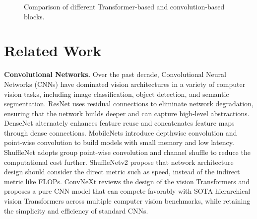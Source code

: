 \documentclass[10pt,twocolumn,letterpaper]{article}
\begin{document}
\begin{figure*} [t]
\centering
{}
\hspace{0.01mm}
\hspace{0.01mm}
\hspace{0.01mm}
\hspace{0.01mm}
\hspace{0.01mm}
\hspace{0.01mm}
\caption{Comparison of different Transformer-based and convolution-based blocks.}
\label{fig:blocks}
\end{figure*}

\section{Related Work}
	\textbf{Convolutional Networks.}
    Over the past decade, Convolutional Neural Networks (CNNs) have dominated vision architectures in a variety of computer vision tasks, including image classification, object detection, and semantic segmentation.
    ResNet\cite{ResNet} uses residual connections to eliminate network degradation, ensuring that the network builds deeper and can capture high-level abstractions.
	DenseNet\cite{DenseNet} alternately enhances feature reuse and concatenates feature maps through dense connections.
	MobileNets\cite{Mobilenets, MobileNet_v2}  introduce depthwise convolution and point-wise convolution to build models with small memory and low latency.
	ShuffleNet\cite{Shufflenet} adopts group point-wise convolution and channel shuffle to reduce the computational cost further. ShuffleNetv2\cite{ShuffleNet_v2} propose that network architecture design should consider the direct metric such as speed, instead of the indirect metric like FLOPs. 
	ConvNeXt\cite{ConvNext} reviews the design of the vision Transformers and proposes a pure CNN model that can compete favorably with SOTA hierarchical vision Transformers across multiple computer vision benchmarks, while retaining the simplicity and efficiency of standard CNNs.
	
\end{document}

